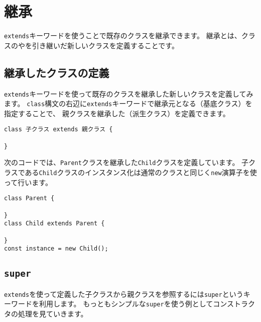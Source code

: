 \hypertarget{extends}{%
\section{継承}\label{extends}}

\texttt{extends}キーワードを使うことで既存のクラスを継承できます。
継承とは、クラスの\textbf{}や\textbf{}を引き継いだ新しいクラスを定義することです。

\hypertarget{class-extends}{%
\subsection{継承したクラスの定義}\label{class-extends}}

\texttt{extends}キーワードを使って既存のクラスを継承した新しいクラスを定義してみます。
\texttt{class}構文の右辺に\texttt{extends}キーワードで継承元となる\textbf{}（基底クラス）を指定することで、
親クラスを継承した\textbf{}（派生クラス）を定義できます。

\begin{lstlisting}
class 子クラス extends 親クラス {

}
\end{lstlisting}

次のコードでは、\texttt{Parent}クラスを継承した\texttt{Child}クラスを定義しています。
子クラスである\texttt{Child}クラスのインスタンス化は通常のクラスと同じく\texttt{new}演算子を使って行います。

\begin{lstlisting}
class Parent {

}
class Child extends Parent {

}
const instance = new Child();
\end{lstlisting}

\hypertarget{class-super}{%
\subsection{\texorpdfstring{\texttt{super}}{super}}\label{class-super}}

\texttt{extends}を使って定義した子クラスから親クラスを参照するには\texttt{super}というキーワードを利用します。
もっともシンプルな\texttt{super}を使う例としてコンストラクタの処理を見ていきます。

